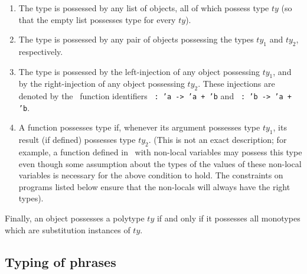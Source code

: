 \documentclass[11pt]{article}
\begin{document}
\begin{enumerate}\vspace*{-2mm}\setlength{\itemsep}{0mm}

  \item The type  is possessed by any list of objects, all of
	which possess type $ty$ (so that the empty list possesses type  for every $ty$).

  \item The type  is possessed by any pair of objects
	possessing the types $ty_1$ and $ty_2$, respectively.

  \item The type  is possessed by the left-injection of any
	object possessing $ty_1$, and by the right-injection of any object
	possessing $ty_2$.  These injections are denoted by the \ML\ function
	identifiers {\tt {} :\ 'a -> 'a + 'b} and {\tt{} :\ 'b -> 'a +
	'b}.%

  \item A function possesses type  if, whenever its
	argument possesses type $ty_1$, its result (if defined) possesses type
	$ty_2$. (This is not an exact description; for example, a function
	defined in \ML\ with non-local variables may possess this type even
	though some assumption about the types of the values of these non-local
	variables is necessary for the above condition to hold.  The constraints
	on programs listed below ensure that the non-locals will always have the
	right types).

\end{enumerate}\vspace*{-2mm}

Finally, an object possesses a polytype $ty$ if and only if it possesses all
monotypes which are substitution instances of $ty$.


\subsection{Typing of {\ML} phrases}
\end{document}
